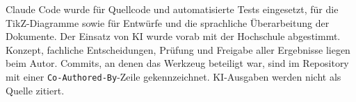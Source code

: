 Claude Code wurde für Quellcode und automatisierte Tests eingesetzt, für die TikZ-Diagramme sowie für Entwürfe und die sprachliche Überarbeitung der Dokumente. Der Einsatz von \ac{KI} wurde vorab mit der Hochschule abgestimmt. Konzept, fachliche Entscheidungen, Prüfung und Freigabe aller Ergebnisse liegen beim Autor. Commits, an denen das Werkzeug beteiligt war, sind im Repository mit einer \texttt{Co-Authored-By}-Zeile gekennzeichnet. \ac{KI}-Ausgaben werden nicht als Quelle zitiert.
